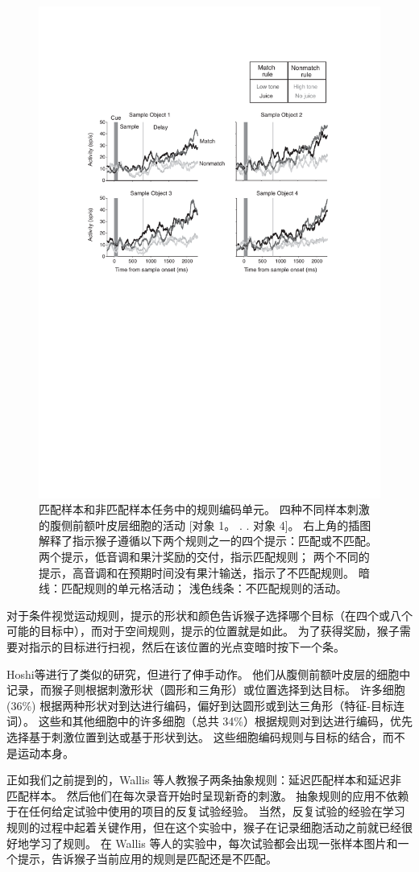 \begin{figure}
	\centering
	\includegraphics[width=0.6\linewidth]{chap7/7_9}
	\caption{匹配样本和非匹配样本任务中的规则编码单元。
		四种不同样本刺激的腹侧前额叶皮层细胞的活动 [对象 1。 . . 对象 4]。 
		右上角的插图解释了指示猴子遵循以下两个规则之一的四个提示：匹配或不匹配。
		两个提示，低音调和果汁奖励的交付，指示匹配规则；
		两个不同的提示，高音调和在预期时间没有果汁输送，指示了不匹配规则。 
		暗线：匹配规则的单元格活动； 浅色线条：不匹配规则的活动\cite{wallis2001single}。 \label{fig:7_9}}
\end{figure}
\par


对于条件视觉运动规则，提示的形状和颜色告诉猴子选择哪个目标（在四个或八个可能的目标中），而对于空间规则，提示的位置就是如此。 
为了获得奖励，猴子需要对指示的目标进行扫视，然后在该位置的光点变暗时按下一个条。
\par


Hoshi等\cite{hoshi1998task}进行了类似的研究，但进行了伸手动作。 
他们从腹侧前额叶皮层的细胞中记录，而猴子则根据刺激形状（圆形和三角形）或位置选择到达目标。
许多细胞 (36\%) 根据两种形状对到达进行编码，偏好到达圆形或到达三角形（特征-目标连词）。
这些和其他细胞中的许多细胞（总共 34\%）根据规则对到达进行编码，优先选择基于刺激位置到达或基于形状到达。 
这些细胞编码规则与目标的结合，而不是运动本身。
\par


正如我们之前提到的，Wallis 等人\cite{wallis2001single}教猴子两条抽象规则：延迟匹配样本和延迟非匹配样本。 
然后他们在每次录音开始时呈现新奇的刺激。 抽象规则的应用不依赖于在任何给定试验中使用的项目的反复试验经验。 
当然，反复试验的经验在学习规则的过程中起着关键作用，但在这个实验中，猴子在记录细胞活动之前就已经很好地学习了规则。 
在 Wallis 等人的实验中，每次试验都会出现一张样本图片和一个提示，告诉猴子当前应用的规则是匹配还是不匹配。
\par


